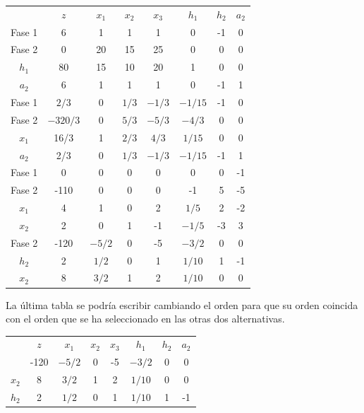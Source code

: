\begin{enumerate}
    \begin{center}
    \begin{tabular}{c|c|cccccc|}
     & $z$ & $x_1$ & $x_2$ & $x_3$ & $h_1$ & $h_2$ & $a_2$\\ 
    Fase 1 & 6 & 1 & 1 & 1 & 0 & -1 & 0 \\ 
    Fase 2 & 0 & 20 & 15 & 25 & 0 & 0 & 0 \\ 
    \hline
    $h_1$ & 80  & 15 & 10 & 20 & 1 & 0 & 0\\ 
    $a_2$ & 6  & 1 & 1 & 1 & 0 & -1 & 1\\ 
    \hline
    Fase 1 & $2/3$ & 0 & $1/3$ & $-1/3$ & $-1/15$ & -1 & 0 \\ 
    Fase 2 & $-320/3$ & 0 & $5/3$ & $-5/3$ & $-4/3$ & 0 & 0 \\ 
    \hline
    $x_1$ & 16/3  & 1 & $2/3$ & $4/3$ & $1/15$ & 0 & 0\\ 
    $a_2$ & 2/3  & 0 & $1/3$ & $-1/3$ & $-1/15$ & -1 & 1\\ 
    \hline
    Fase 1 & 0 & 0 & 0 & 0 & 0 & 0 & -1 \\ 
    Fase 2 & -110 & 0 & 0 & 0 & -1 & 5 & -5 \\ 
    \hline
    $x_1$ & 4  & 1 & 0 & 2 & $1/5$ & 2 & -2\\ 
    $x_2$ & 2  & 0 & 1 & -1 & $-1/5$ & -3 & 3\\ 
    \hline
    Fase 2 & -120 & $-5/2$ & 0 & -5 & $-3/2$ & 0 & 0 \\ 
    \hline
    $h_2$ & 2  & $1/2$ & 0 & 1 & $1/10$ & 1 & -1\\ 
    $x_2$ & 8  & $3/2$ & 1 & 2 & $1/10$ & 0 & 0\\ 
    \hline
    \end{tabular}
    \end{center}

    La última tabla se podría escribir cambiando el orden para que su orden coincida con el orden que se ha seleccionado en las otras dos alternativas.

    \begin{center}
    \begin{tabular}{c|c|cccccc|}
     & $z$ & $x_1$ & $x_2$ & $x_3$ & $h_1$ & $h_2$ & $a_2$\\ 
      & -120 & $-5/2$ & 0 & -5 & $-3/2$ & 0 & 0 \\ 
    \hline
    $x_2$ & 8  & $3/2$ & 1 & 2 & $1/10$ & 0 & 0\\ 
    $h_2$ & 2  & $1/2$ & 0 & 1 & $1/10$ & 1 & -1\\ 
    \hline
    \end{tabular}
    \end{center}


\end{enumerate}
